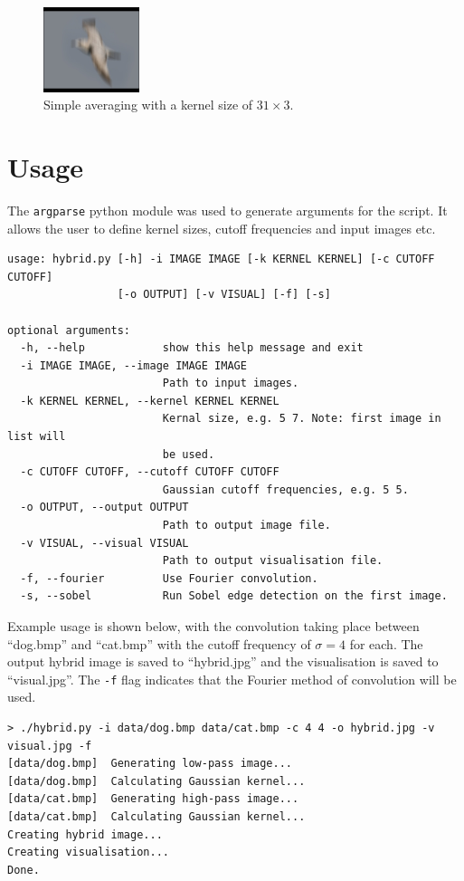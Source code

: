 \documentclass[a4paper]{article}
\begin{document}
\begin{figure}[!htbp]
    \centering
    \includegraphics[width=0.25\textwidth]{../arb}
    \caption{Simple averaging with a kernel size of $31\times 3$.}
    \label{fig:arb-kern}
\end{figure}

\section{Usage}
The \texttt{argparse} python module was used to generate arguments for the script. It allows the user to define kernel sizes, cutoff frequencies and input images etc.

\begin{verbatim}
usage: hybrid.py [-h] -i IMAGE IMAGE [-k KERNEL KERNEL] [-c CUTOFF CUTOFF]
                 [-o OUTPUT] [-v VISUAL] [-f] [-s]

optional arguments:
  -h, --help            show this help message and exit
  -i IMAGE IMAGE, --image IMAGE IMAGE
                        Path to input images.
  -k KERNEL KERNEL, --kernel KERNEL KERNEL
                        Kernal size, e.g. 5 7. Note: first image in list will
                        be used.
  -c CUTOFF CUTOFF, --cutoff CUTOFF CUTOFF
                        Gaussian cutoff frequencies, e.g. 5 5.
  -o OUTPUT, --output OUTPUT
                        Path to output image file.
  -v VISUAL, --visual VISUAL
                        Path to output visualisation file.
  -f, --fourier         Use Fourier convolution.
  -s, --sobel           Run Sobel edge detection on the first image.
\end{verbatim}

Example usage is shown below, with the convolution taking place between ``dog.bmp'' and ``cat.bmp'' with the cutoff frequency of $\sigma=4$ for each. The output hybrid image is saved to ``hybrid.jpg'' and the visualisation is saved to ``visual.jpg''. The \texttt{-f} flag indicates that the Fourier method of convolution will be used.

\begin{verbatim}
> ./hybrid.py -i data/dog.bmp data/cat.bmp -c 4 4 -o hybrid.jpg -v visual.jpg -f
[data/dog.bmp]	Generating low-pass image...
[data/dog.bmp]	Calculating Gaussian kernel...
[data/cat.bmp]	Generating high-pass image...
[data/cat.bmp]	Calculating Gaussian kernel...
Creating hybrid image...
Creating visualisation...
Done.
\end{verbatim}
\end{document}
